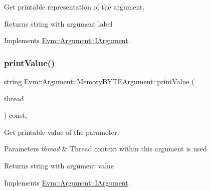 Get printable representation of the argument. 

\begin{DoxyReturn}{Returns}
string with argument label 
\end{DoxyReturn}


Implements \mbox{\hyperlink{struct_evm_1_1_argument_1_1_i_argument_a35bdae816e89f6f9fc393b6e03c5e521}{Evm\+::\+Argument\+::\+I\+Argument}}.

\mbox{\label{struct_evm_1_1_argument_1_1_memory_b_y_t_e_argument_a7fbed3cafe6784094617c522a2c91412}} 
\subsubsection{\texorpdfstring{print\+Value()}{printValue()}}
{\footnotesize\ttfamily string Evm\+::\+Argument\+::\+Memory\+B\+Y\+T\+E\+Argument\+::print\+Value (\begin{DoxyParamCaption}\item[{\mbox{\hyperlink{struct_evm_1_1_thread_context}{Thread\+Context}} \&}]{thread }\end{DoxyParamCaption}) const\hspace{0.3cm}{\ttfamily [override]}, {\ttfamily [virtual]}}



Get printable value of the parameter. 


\begin{DoxyParams}{Parameters}
{\em thread} & Thread context within this argument is used \\
\hline
\end{DoxyParams}
\begin{DoxyReturn}{Returns}
string with argument value 
\end{DoxyReturn}


Implements \mbox{\hyperlink{struct_evm_1_1_argument_1_1_i_argument_afcab2d2a1515518a111881a635c83da3}{Evm\+::\+Argument\+::\+I\+Argument}}.

\mbox{\label{struct_evm_1_1_argument_1_1_memory_b_y_t_e_argument_a6da25d3c59f1676c39ac8f0f0f211863}} 
